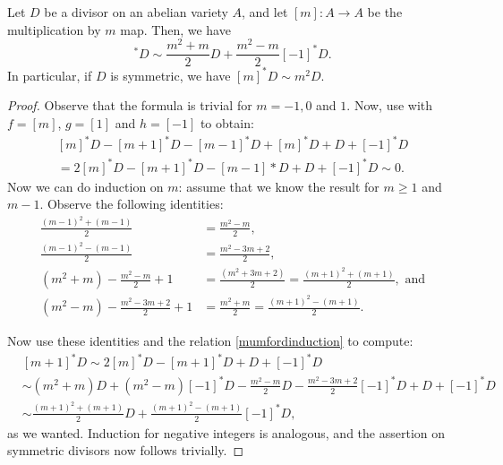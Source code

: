 \begin{corollary}\label{mumfordformula}
	Let $D$ be a divisor on an abelian variety $A$, and let $[m]:A\rightarrow A$ be the multiplication by $m$ map. Then, we have
	\begin{equation*}
		[m]^*D\sim\frac{m^2+m}{2}D+\frac{m^2-m}{2}[-1]^*D.
	\end{equation*}
	In particular, if $D$ is symmetric, we have $[m]^*D\sim m^2D$.
\end{corollary}
\begin{proof}
	Observe that the formula is trivial for $m=-1,0$ and $1$. Now, use  with $f=[m]$, $g=[1]$ and $h=[-1]$ to obtain:
	\begin{align}\label{mumfordinduction}
		[m]^*D-[m+1]^*D-[m-1]^*D+[m]^*D+D+[-1]^*D\\
		=2[m]^*D-[m+1]^*D-[m-1]*D+D+[-1]^*D\sim 0.
	\end{align}
	Now we can do induction on $m$: assume that we know the result for $m\ge1$ and $m-1$. Observe the following identities:
	\begin{align*}
		\frac{(m-1)^2+(m-1)}{2}&=\frac{m^2-m}{2},\\
		\frac{(m-1)^2-(m-1)}{2}&=\frac{m^2-3m+2}{2},\\
		(m^2+m)-\frac{m^2-m}{2}+1&=\frac{(m^2+3m+2)}{2}=\frac{(m+1)^2+(m+1)}{2}, \text{ and}\\
		(m^2-m)-\frac{m^2-3m+2}{2}+1&=\frac{m^2+m}{2}=\frac{(m+1)^2-(m+1)}{2}.
	\end{align*}
	
	Now use these identities and the relation \eqref{mumfordinduction} to compute:
	\begin{align*}
		&[m+1]^*D\sim2[m]^*D-[m+1]^*D+D+[-1]^*D\\
		&\sim(m^2+m)D+(m^2-m)[-1]^*D-\frac{m^2-m}{2}D-\frac{m^2-3m+2}{2}[-1]^*D+D+[-1]^*D\\
		&\sim\frac{(m+1)^2+(m+1)}{2}D+\frac{(m+1)^2-(m+1)}{2}[-1]^*D,
	\end{align*}
	as we wanted. Induction for negative integers is analogous, and the assertion on symmetric divisors now follows trivially.
\end{proof}

